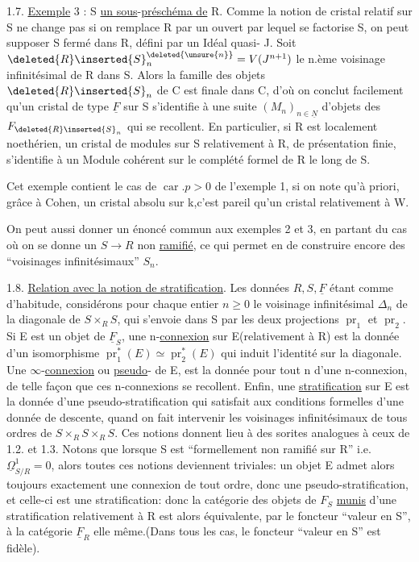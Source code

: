 1.7.  \uline{Exemple} 3 : S \uline{un sous}-\uline{préschéma de} R. Comme la notion de cristal relatif sur S ne change pas si on remplace R par un ouvert par lequel se factorise S, on peut supposer S fermé dans R, défini par un Idéal quasi- J. Soit $\deleted{R}\inserted{S}_n^{\deleted{\unsure{n}}}=V(J^{n+1})$ le n.ème voisinage infinitésimal de R dans S. Alors la famille des objets $\deleted{R}\inserted{S}_n$ de C est finale dans C, d'où on conclut facilement qu'un cristal de type $\underline F$ sur S s'identifie à une suite $(M_n)_{n\in\underline N}$ d'objets des $F_{\deleted{R}\inserted{S}_n}$ qui se recollent. En particulier, si R est localement noethérien, un cristal de modules sur S relativement à R, de présentation finie, s'identifie à un Module cohérent sur le complété formel de R le long de S.



Cet exemple contient le cas de $\operatorname{car}.p>0$ de l'exemple 1, si on note qu'à priori, grâce à Cohen, un cristal absolu sur k,c'est pareil qu'un cristal relativement à W.

On peut aussi donner un énoncé commun aux  exemples 2 et 3, en partant du cas où on se donne un $S\longrightarrow R$ non \uline{ramifié}, ce qui permet en  de construire encore des ``voisinages infinitésimaux'' $S_n$.

1.8. \uline{Relation avec la notion de stratification}. Les données $R,S,\underline F$ étant comme d'habitude, considérons pour chaque entier $n\ge0$ le voisinage infinitésimal $\Delta_n$ de la diagonale de $S\times_RS$, qui s'envoie dans S par les deux projections $\operatorname{pr}_1$ et $\operatorname{pr}_2$. Si E est un objet de $\underline F_S$, une n-\uline{connexion} sur E(relativement à R) est la donnée d'un isomorphisme $\operatorname{pr}_1^*(E)\simeq\operatorname{pr}_2^*(E)$ qui induit l'identité sur la diagonale. Une $\infty$-\uline{connexion} ou \uline{pseudo}-\uline{} de E, est la donnée pour tout n d'une n-connexion, de telle façon que ces n-connexions se recollent. Enfin, une \uline{stratification} sur E est la donnée d'une pseudo-stratification qui satisfait aux conditions formelles d'une donnée de descente, quand on fait intervenir les voisinages infinitésimaux de tous ordres de  $S\times_RS\times_RS$. Ces notions donnent lieu à des sorites analogues à ceux de 1.2. et 1.3. Notons que lorsque S est ``formellement non ramifié sur R'' i.e. $\underline\Omega^1_{S/R}=0$, alors toutes ces notions deviennent triviales: un objet E admet alors toujours exactement une connexion de tout ordre, donc une  pseudo-stratification, et celle-ci est une stratification: donc la catégorie des objets de $F_S$ \uline{munis} d'une stratification relativement à R est alors équivalente, par le foncteur ``valeur en S'', à la catégorie $\underline F_R$ elle même.(Dans tous les cas, le foncteur ``valeur en S'' est  fidèle).

